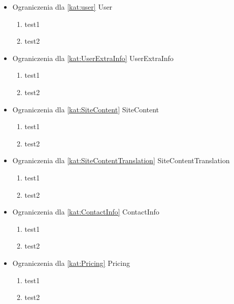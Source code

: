\begin{itemize}[label={}]
    \setlength\itemsep{1em}
    \item Ograniczenia dla \ref{kat:user} User
    \begin{enumerate}[label={\textbf{OGR/\protect\threedigits{\arabic{enumi}}}}, wide, labelwidth=!]
        \item test1
        \item test2
    \end{enumerate}
    \item Ograniczenia dla \ref{kat:UserExtraInfo} UserExtraInfo
    \begin{enumerate}[label={\textbf{OGR/\protect\threedigits{\arabic{enumi}}}}, wide, labelwidth=!, resume]
        \item test1
        \item test2
    \end{enumerate}
    \item Ograniczenia dla \ref{kat:SiteContent} SiteContent
    \begin{enumerate}[label={\textbf{OGR/\protect\threedigits{\arabic{enumi}}}}, wide, labelwidth=!, resume]
        \item test1
        \item test2
    \end{enumerate}
    \item Ograniczenia dla \ref{kat:SiteContentTranslation} SiteContentTranslation
    \begin{enumerate}[label={\textbf{OGR/\protect\threedigits{\arabic{enumi}}}}, wide, labelwidth=!, resume]
        \item test1
        \item test2
    \end{enumerate}
    \item Ograniczenia dla \ref{kat:ContactInfo} ContactInfo
    \begin{enumerate}[label={\textbf{OGR/\protect\threedigits{\arabic{enumi}}}}, wide, labelwidth=!, resume]
        \item test1
        \item test2
    \end{enumerate}
    \item Ograniczenia dla \ref{kat:Pricing} Pricing
    \begin{enumerate}[label={\textbf{OGR/\protect\threedigits{\arabic{enumi}}}}, wide, labelwidth=!, resume]
        \item test1
        \item test2

\end{enumerate}
\end{itemize}
